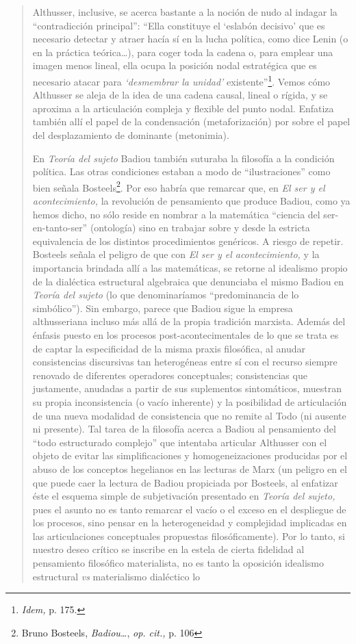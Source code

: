 \begin{quote}
Althusser, inclusive, se acerca bastante a la noción de nudo al indagar la \enquote{contradicción principal}: \enquote{Ella constituye el \enquote{eslabón decisivo} que es necesario detectar y atraer hacía sí en la lucha política, como dice Lenin (o en la práctica teórica\ldots), para coger toda la cadena o, para emplear una imagen menos lineal, ella ocupa la posición nodal estratégica que es necesario atacar para \emph{\enquote{desmembrar la unidad}} existente}\footnote{\emph{Idem,} p. 175.}. Vemos cómo Althusser se aleja de la idea de una cadena causal, lineal o rígida, y se aproxima a la articulación compleja y flexible del punto nodal. Enfatiza también allí el papel de la condensación (metaforización) por sobre el papel del desplazamiento de dominante (metonimia).

En \emph{Teoría del sujeto} Badiou también suturaba la filosofía a la condición política. Las otras condiciones estaban a modo de \enquote{ilustraciones} como bien señala Bosteels\footnote{Bruno Bosteels, \emph{Badiou\ldots{}}, \emph{op. cit.,} p. 106}. Por eso habría que remarcar que, en \emph{El ser y el acontecimiento,} la revolución de pensamiento que produce Badiou, como ya hemos dicho, no sólo reside en nombrar a la matemática \enquote{ciencia del ser-en-tanto-ser} (ontología) sino en trabajar sobre y desde la estricta equivalencia de los distintos procedimientos genéricos. A riesgo de repetir. Bosteels señala el peligro de que con \emph{El ser y el acontecimiento,} y la importancia brindada allí a las matemáticas, se retorne al idealismo propio de la dialéctica estructural algebraica que denunciaba el mismo Badiou en \emph{Teoría del sujeto} (lo que denominaríamos \enquote{predominancia de lo simbólico}). Sin embargo, parece que Badiou sigue la empresa althusseriana incluso más allá de la propia tradición marxista. Además del énfasis puesto en los procesos post-acontecimentales  de lo que se trata es de captar la especificidad de la misma praxis filosófica, al anudar consistencias discursivas tan heterogéneas entre sí con el recurso siempre renovado de diferentes operadores conceptuales; consistencias que justamente, anudadas a partir de sus suplementos sintomáticos, muestran su propia inconsistencia (o vacío inherente) y la posibilidad de articulación de una nueva modalidad de consistencia que no remite al Todo (ni ausente ni presente). Tal tarea de la filosofía acerca a Badiou al pensamiento del \enquote{todo estructurado complejo} que intentaba articular Althusser con el objeto de evitar las simplificaciones y homogeneizaciones producidas por el abuso de los conceptos hegelianos en las lecturas de Marx (un peligro en el que puede caer la lectura de Badiou propiciada por Bosteels, al enfatizar éste el esquema simple de subjetivación presentado en \emph{Teoría del sujeto,} pues el asunto no es tanto remarcar el vacío o el exceso en el despliegue de los procesos, sino pensar en la heterogeneidad y complejidad implicadas en las articulaciones conceptuales propuestas filosóficamente). Por lo tanto, si nuestro deseo crítico se inscribe en la estela de cierta fidelidad al pensamiento filosófico materialista, no es tanto la oposición idealismo estructural \emph{vs} materialismo dialéctico lo 
\end{quote}
